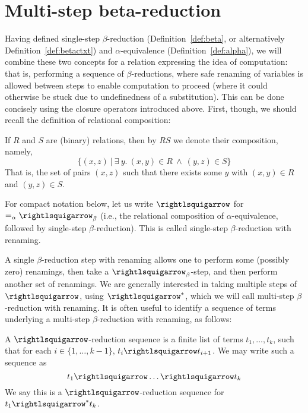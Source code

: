 \section{Multi-step beta-reduction}
\label{sec:multibeta}

Having defined single-step $\beta$-reduction
(Definition~\ref{def:beta}, or alternatively
Definition~\ref{def:betactxt}) and $\alpha$-equivalence
(Definition~\ref{def:alpha}), we will combine these two concepts for a
relation expressing the idea of computation: that is, performing a
sequence of $\beta$-reductions, where safe renaming of variables is
allowed between steps to enable computation to proceed (where it could
otherwise be stuck due to undefinedness of a substitution).  This can
be done concisely using the closure operators introduced above.
First, though, we should recall the definition of relational
composition:

\begin{definition}
  If $R$ and $S$ are (binary) relations, then by $R S$ we denote their
  composition, namely,
  \[
  \{ (x,z)\ |\ \exists\ y.\ (x,y)\in R \ \wedge\ (y,z) \in S \}
  \]
  \noindent That is, the set of pairs $(x,z)$ such that there exists some $y$ with
  $(x,y) \in R$ and $(y,z)\in S$.
\end{definition}

\begin{definition}
\label{def:betaa}
  For compact notation below, let us write $\betaa$ for $=_\alpha \betar$
  (i.e., the relational composition of
$\alpha$-equivalence, followed by single-step $\beta$-reduction).  This is called single-step
$\beta$-reduction with renaming.
\end{definition}

A single $\beta$-reduction step with renaming allows one to perform some (possibly zero)
renamings, then take a $\betar$-step, and then perform another set of renamings.
We are generally interested in taking multiple steps of $\betaa$, using $\betaa^*$, which
we will call multi-step $\beta$-reduction with renaming.
It is often useful to identify a sequence of terms underlying a
multi-step $\beta$-reduction with renaming, as follows:

\begin{definition}
\label{def:betars}
  A $\betaa$-reduction sequence is a finite list of terms
  $t_1,\ldots,t_k$, such that for each $i\in\{1,\ldots,k-1\}$,
  $t_i \betaa t_{i+1}$.  We may write such
  a sequence as
  \[
  t_1 \betaa \ldots \betaa t_k
  \]
  We say this is a $\betaa$-reduction sequence for $t_1\betaa^* t_k$.
\end{definition}

